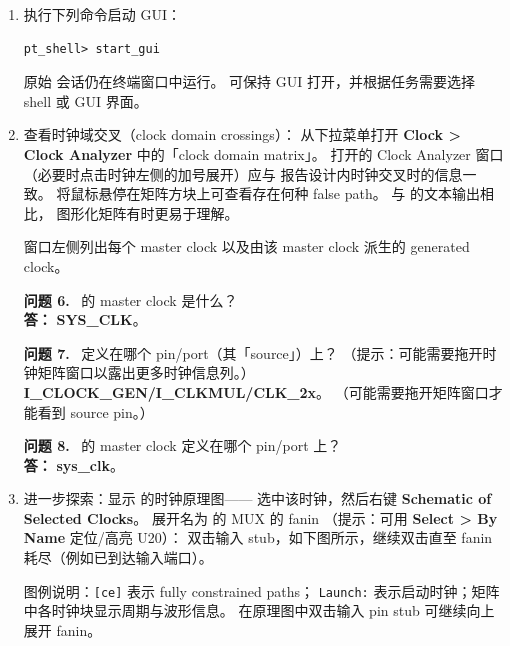 \begin{enumerate}
  \item 执行下列命令启动 GUI：
\begin{lstlisting}
pt_shell> start_gui
\end{lstlisting}

\begin{noteBox}
原始  会话仍在终端窗口中运行。
可保持 GUI 打开，并根据任务需要选择 shell 或 GUI 界面。
\end{noteBox}

  \item 查看时钟域交叉（clock domain crossings）：
        从下拉菜单打开 \textbf{Clock > Clock Analyzer} 中的「clock domain matrix」。
        打开的 Clock Analyzer 窗口（必要时点击时钟左侧的加号展开）应与
         报告设计内时钟交叉时的信息一致。
        将鼠标悬停在矩阵方块上可查看存在何种 false path。
        与  的文本输出相比，
        图形化矩阵有时更易于理解。

        窗口左侧列出每个 master clock 以及由该 master clock 派生的 generated clock。

\begin{questionBox}
\textbf{问题 6.}\  的 master clock 是什么？\\[0.35em]
\textbf{答：} \textbf{SYS\_CLK}。

\textbf{问题 7.}\  定义在哪个 pin/port（其「source」）上？
（提示：可能需要拖开时钟矩阵窗口以露出更多时钟信息列。）\\[0.35em]
\textbf{I\_CLOCK\_GEN/I\_CLKMUL/CLK\_2x}。
（可能需要拖开矩阵窗口才能看到 source pin。）

\textbf{问题 8.}\  的 master clock 定义在哪个 pin/port 上？\\[0.35em]
\textbf{答：} \textbf{sys\_clk}。
\end{questionBox}

  \item 进一步探索：显示  的时钟原理图——
        选中该时钟，然后右键 \textbf{Schematic of Selected Clocks}。
        展开名为  的 MUX 的 fanin
        （提示：可用 \textbf{Select > By Name} 定位/高亮 U20）：
        双击输入 stub，如下图所示，继续双击直至 fanin 耗尽（例如已到达输入端口）。

\begin{noteBox}
图例说明：\texttt{[ce]} 表示 fully constrained paths；
\texttt{Launch:} 表示启动时钟；矩阵中各时钟块显示周期与波形信息。
在原理图中双击输入 pin stub 可继续向上展开 fanin。
\end{noteBox}


\end{enumerate}

